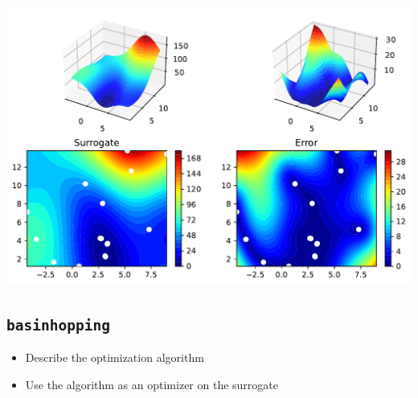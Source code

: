\documentclass[
  letterpaper,
  DIV=11,
  numbers=noendperiod]{scrreprt}
\providecommand{\tightlist}{%
  \setlength{\itemsep}{0pt}\setlength{\parskip}{0pt}}\usepackage{longtable,booktabs,array}
\begin{document}
\begin{tcolorbox}
\includegraphics{004_spot_sklearn_optimization_files/figure-pdf/cell-11-output-3.pdf}

\end{tcolorbox}

\subsection{\texorpdfstring{\texttt{basinhopping}}{basinhopping}}\label{basinhopping}

\begin{itemize}
\tightlist
\item
  Describe the optimization algorithm
\item
  Use the algorithm as an optimizer on the surrogate
\end{itemize}
\end{document}
